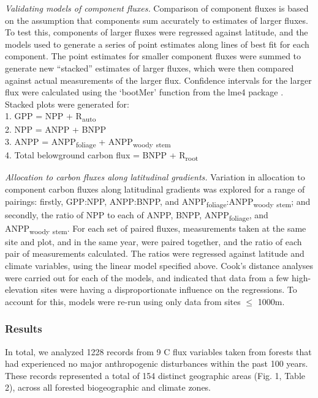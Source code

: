 \documentclass[]{article}
\begin{document}
\emph{Validating models of component fluxes.} Comparison of component
fluxes is based on the assumption that components sum accurately to
estimates of larger fluxes. To test this, components of larger fluxes
were regressed against latitude, and the models used to generate a
series of point estimates along lines of best fit for each component.
The point estimates for smaller component fluxes were summed to generate
new ``stacked'' estimates of larger fluxes, which were then compared
against actual measurements of the larger flux. Confidence intervals for
the larger flux were calculated using the `bootMer' function from the
lme4 package \citep{bates_fitting_2015}. Stacked plots were generated
for:\\
1. GPP = NPP + R\textsubscript{auto}\\
2. NPP = ANPP + BNPP\\
3. ANPP = ANPP\textsubscript{foliage} + ANPP\textsubscript{woody}
\textsubscript{stem}\\
4. Total belowground carbon flux = BNPP + R\textsubscript{root}

\emph{Allocation to carbon fluxes along latitudinal gradients.}
Variation in allocation to component carbon fluxes along latitudinal
gradients was explored for a range of pairings: firstly, GPP:NPP,
ANPP:BNPP, and ANPP\textsubscript{foliage}:ANPP\textsubscript{woody}
\textsubscript{stem}; and secondly, the ratio of NPP to each of ANPP,
BNPP, ANPP\textsubscript{foliage}, and ANPP\textsubscript{woody}
\textsubscript{stem}. For each set of paired fluxes, measurements taken
at the same site and plot, and in the same year, were paired together,
and the ratio of each pair of measurements calculated. The ratios were
regressed against latitude and climate variables, using the linear model
specified above. Cook's distance analyses were carried out for each of
the models, and indicated that data from a few high-elevation sites were
having a disproportionate influence on the regressions. To account for
this, models were re-run using only data from sites \(\le\) 1000m.

\subsubsection{Results}\label{results}

In total, we analyzed 1228 records from 9 C flux variables taken from
forests that had experienced no major anthropogenic disturbances within
the past 100 years. These records represented a total of 154 distinct
geographic areas (Fig. 1, Table 2), across all forested biogeographic
and climate zones.
\end{document}
